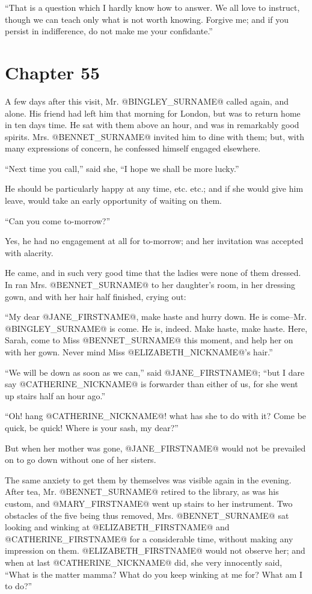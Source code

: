 ``That is a question which I hardly know how to answer. We all love to
instruct, though we can teach only what is not worth knowing. Forgive
me; and if you persist in indifference, do not make me your confidante.''



\chapter*{Chapter 55}


A few days after this visit, Mr. @BINGLEY_SURNAME@ called again, and alone. His
friend had left him that morning for London, but was to return home in
ten days time. He sat with them above an hour, and was in remarkably
good spirits. Mrs. @BENNET_SURNAME@ invited him to dine with them; but, with many
expressions of concern, he confessed himself engaged elsewhere.

``Next time you call,'' said she, ``I hope we shall be more lucky.''

He should be particularly happy at any time, etc. etc.; and if she would
give him leave, would take an early opportunity of waiting on them.

``Can you come to-morrow?''

Yes, he had no engagement at all for to-morrow; and her invitation was
accepted with alacrity.

He came, and in such very good time that the ladies were none of them
dressed. In ran Mrs. @BENNET_SURNAME@ to her daughter's room, in her dressing
gown, and with her hair half finished, crying out:

``My dear @JANE_FIRSTNAME@, make haste and hurry down. He is come--Mr. @BINGLEY_SURNAME@ is
come. He is, indeed. Make haste, make haste. Here, Sarah, come to Miss
@BENNET_SURNAME@ this moment, and help her on with her gown. Never mind Miss
@ELIZABETH_NICKNAME@'s hair.''

``We will be down as soon as we can,'' said @JANE_FIRSTNAME@; ``but I dare say @CATHERINE_NICKNAME@ is
forwarder than either of us, for she went up stairs half an hour ago.''

``Oh! hang @CATHERINE_NICKNAME@! what has she to do with it? Come be quick, be quick!
Where is your sash, my dear?''

But when her mother was gone, @JANE_FIRSTNAME@ would not be prevailed on to go down
without one of her sisters.

The same anxiety to get them by themselves was visible again in the
evening. After tea, Mr. @BENNET_SURNAME@ retired to the library, as was his
custom, and @MARY_FIRSTNAME@ went up stairs to her instrument. Two obstacles of
the five being thus removed, Mrs. @BENNET_SURNAME@ sat looking and winking at
@ELIZABETH_FIRSTNAME@ and @CATHERINE_FIRSTNAME@ for a considerable time, without making any
impression on them. @ELIZABETH_FIRSTNAME@ would not observe her; and when at last
@CATHERINE_NICKNAME@ did, she very innocently said, ``What is the matter mamma? What do
you keep winking at me for? What am I to do?''

